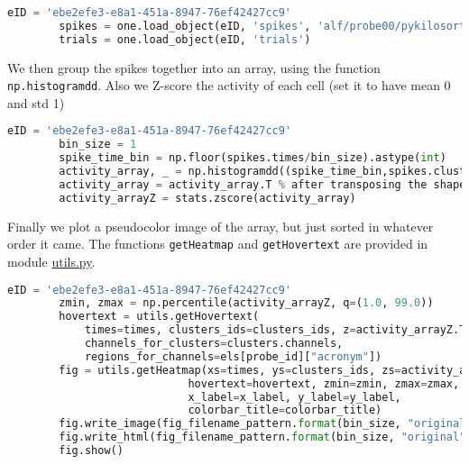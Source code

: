 \documentclass[12pt]{article}
\begin{document}
\begin{enumerate}
        \begin{lstlisting}[backgroundcolor=\color{lightgray},language=Python]
        eID = 'ebe2efe3-e8a1-451a-8947-76ef42427cc9'
        spikes = one.load_object(eID, 'spikes', 'alf/probe00/pykilosort')
        trials = one.load_object(eID, 'trials')
        \end{lstlisting}

        We then group the spikes together into an array, using the function
        \texttt{np.histogramdd}. Also we Z-score the activity of each cell (set
        it to have mean 0 and std 1)

        \begin{lstlisting}[backgroundcolor=\color{lightgray},language=Python]
        eID = 'ebe2efe3-e8a1-451a-8947-76ef42427cc9'
        bin_size = 1
        spike_time_bin = np.floor(spikes.times/bin_size).astype(int)
        activity_array, _ = np.histogramdd((spike_time_bin,spikes.clusters), bins=( spike_time_bin.max(), spikes.clusters.max()))
        activity_array = activity_array.T % after transposing the shape of activity_array is n_neurons x n_times
        activity_arrayZ = stats.zscore(activity_array)
        \end{lstlisting}

        Finally we plot a pseudocolor image of the array, but just sorted in
        whatever order it came. The functions \texttt{getHeatmap} and
        \texttt{getHovertext} are provided in module
        \href{https://github.com/joacorapela/statNeuro2025/blob/master/worksheets/04_dimensionalityReduction/utils.py}{utils.py}.

        \begin{lstlisting}[backgroundcolor=\color{lightgray},language=Python]
        eID = 'ebe2efe3-e8a1-451a-8947-76ef42427cc9'
        zmin, zmax = np.percentile(activity_arrayZ, q=(1.0, 99.0))
        hovertext = utils.getHovertext(
            times=times, clusters_ids=clusters_ids, z=activity_arrayZ.T,
            channels_for_clusters=clusters.channels,
            regions_for_channels=els[probe_id]["acronym"])
        fig = utils.getHeatmap(xs=times, ys=clusters_ids, zs=activity_arrayZ.T,
                            hovertext=hovertext, zmin=zmin, zmax=zmax,
                            x_label=x_label, y_label=y_label,
                            colorbar_title=colorbar_title)
        fig.write_image(fig_filename_pattern.format(bin_size, "original",  "png"))
        fig.write_html(fig_filename_pattern.format(bin_size, "original",  "html"))
        fig.show()
        \end{lstlisting}


\end{enumerate}
\end{document}

